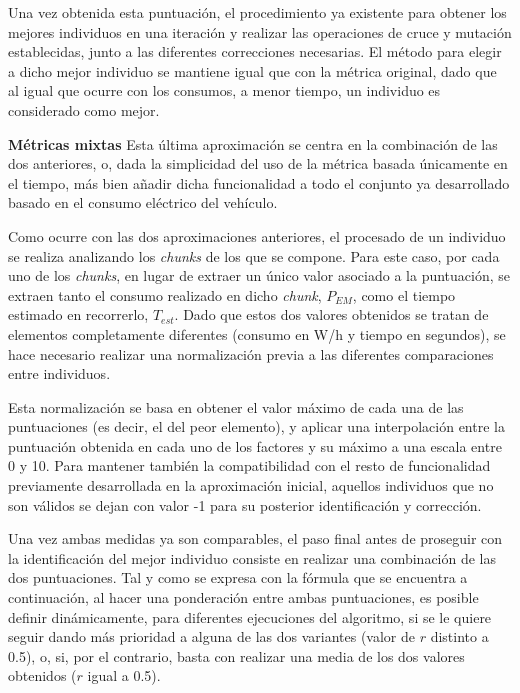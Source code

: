 \documentclass[11pt,spanish,listoffigures,listoftables]{tfgetsinf}
\begin{document}
Una vez obtenida esta puntuación, el procedimiento ya existente para obtener los mejores individuos en una iteración y realizar las operaciones de cruce y mutación establecidas, junto a las diferentes correcciones necesarias. El método para elegir a dicho mejor individuo se mantiene igual que con la métrica original, dado que al igual que ocurre con los consumos, a menor tiempo, un individuo es considerado como mejor.\newline

\noindent\textbf{Métricas mixtas}\newline
Esta última aproximación se centra en la combinación de las dos anteriores, o, dada la simplicidad del uso de la métrica basada únicamente en el tiempo, más bien añadir dicha funcionalidad a todo el conjunto ya desarrollado basado en el consumo eléctrico del vehículo.

Como ocurre con las dos aproximaciones anteriores, el procesado de un individuo se realiza analizando los \textit{chunks} de los que se compone. Para este caso, por cada uno de los \textit{chunks}, en lugar de extraer un único valor asociado a la puntuación, se extraen tanto el consumo realizado en dicho \textit{chunk}, $P_{EM}$, como el tiempo estimado en recorrerlo, $T_{est}$. Dado que estos dos valores obtenidos se tratan de elementos completamente diferentes (consumo en W/h y tiempo en segundos), se hace necesario realizar una normalización previa a las diferentes comparaciones entre individuos.

Esta normalización se basa en obtener el valor máximo de cada una de las puntuaciones (es decir, el del peor elemento), y aplicar una interpolación entre la puntuación obtenida en cada uno de los factores y su máximo a una escala entre 0 y 10. Para mantener también la compatibilidad con el resto de funcionalidad previamente desarrollada en la aproximación inicial, aquellos individuos que no son válidos se dejan con valor -1 para su posterior identificación y corrección.

Una vez ambas medidas ya son comparables, el paso final antes de proseguir con la identificación del mejor individuo consiste en realizar una combinación de las dos puntuaciones. Tal y como se expresa con la fórmula que se encuentra a continuación, al hacer una ponderación entre ambas puntuaciones, es posible definir dinámicamente, para diferentes ejecuciones del algoritmo, si se le quiere seguir dando más prioridad a alguna de las dos variantes (valor de $r$ distinto a 0.5), o, si, por el contrario, basta con realizar una media de los dos valores obtenidos ($r$ igual a 0.5).
\end{document}
